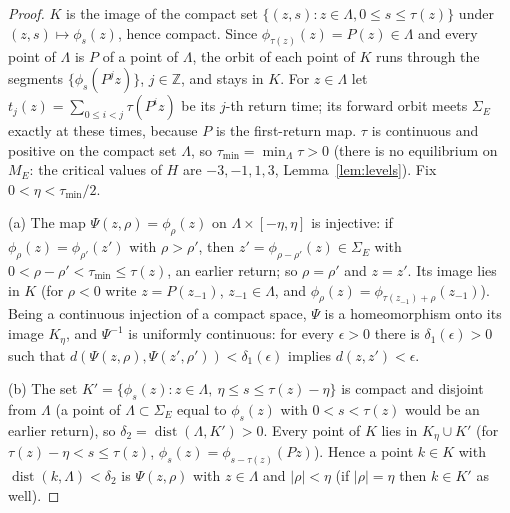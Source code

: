 \documentclass[11pt]{article}
\theoremstyle{definition}
\newcommand{\Z}{\mathbb{Z}}
\begin{document}
\begin{proof}
$K$ is the image of the compact set $\{(z, s) : z \in \Lambda, 0 \le s \le \tau(z)\}$ under $(z, s) \mapsto \phi_s(z)$, hence compact. Since $\phi_{\tau(z)}(z) = P(z) \in \Lambda$ and every point of $\Lambda$ is $P$ of a point of $\Lambda$, the orbit of each point of $K$ runs through the segments $\{\phi_s(P^jz)\}$, $j \in \Z$, and stays in $K$. For $z \in \Lambda$ let $t_j(z) = \sum_{0 \le i < j}\tau(P^iz)$ be its $j$-th return time; its forward orbit meets $\Sigma_E$ exactly at these times, because $P$ is the first-return map. $\tau$ is continuous and positive on the compact set $\Lambda$, so $\tau_{\min} = \min_\Lambda\tau > 0$ (there is no equilibrium on $M_E$: the critical values of $H$ are $-3, -1, 1, 3$, Lemma~\ref{lem:levels}). Fix $0 < \eta < \tau_{\min}/2$.

(a) The map $\Psi(z, \rho) = \phi_\rho(z)$ on $\Lambda \times [-\eta, \eta]$ is injective: if $\phi_\rho(z) = \phi_{\rho'}(z')$ with $\rho > \rho'$, then $z' = \phi_{\rho - \rho'}(z) \in \Sigma_E$ with $0 < \rho - \rho' < \tau_{\min} \le \tau(z)$, an earlier return; so $\rho = \rho'$ and $z = z'$. Its image lies in $K$ (for $\rho < 0$ write $z = P(z_{-1})$, $z_{-1} \in \Lambda$, and $\phi_\rho(z) = \phi_{\tau(z_{-1}) + \rho}(z_{-1})$). Being a continuous injection of a compact space, $\Psi$ is a homeomorphism onto its image $K_\eta$, and $\Psi^{-1}$ is uniformly continuous: for every $\epsilon > 0$ there is $\delta_1(\epsilon) > 0$ such that $d(\Psi(z, \rho), \Psi(z', \rho')) < \delta_1(\epsilon)$ implies $d(z, z') < \epsilon$.

(b) The set $K' = \{\phi_s(z) : z \in \Lambda,\ \eta \le s \le \tau(z) - \eta\}$ is compact and disjoint from $\Lambda$ (a point of $\Lambda \subset \Sigma_E$ equal to $\phi_s(z)$ with $0 < s < \tau(z)$ would be an earlier return), so $\delta_2 = \operatorname{dist}(\Lambda, K') > 0$. Every point of $K$ lies in $K_\eta \cup K'$ (for $\tau(z) - \eta < s \le \tau(z)$, $\phi_s(z) = \phi_{s - \tau(z)}(Pz)$). Hence a point $k \in K$ with $\operatorname{dist}(k, \Lambda) < \delta_2$ is $\Psi(z, \rho)$ with $z \in \Lambda$ and $|\rho| < \eta$ (if $|\rho| = \eta$ then $k \in K'$ as well).


\end{proof}
\end{document}
